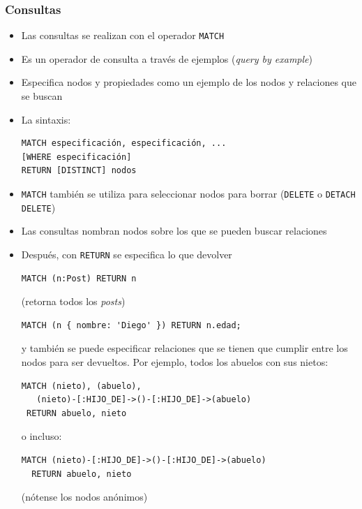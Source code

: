 \documentclass[14pt]{beamer}
\begin{document}
\begin{frame}
\begin{itemize}
\begin{frame}
  \frametitle{Consultas}
  \begin{itemize}
  \item Las consultas se realizan con el operador {\tt MATCH}
  \item Es un operador de consulta a través de ejemplos ({\em query by
      example})
\item Especifica nodos y propiedades como un ejemplo de los nodos y
  relaciones que se buscan
\item La sintaxis:

\begin{lstlisting}[language=cypher]
MATCH especificación, especificación, ...
[WHERE especificación]
RETURN [DISTINCT] nodos
\end{lstlisting}

\item {\tt MATCH} también se utiliza para seleccionar nodos para borrar
  ({\tt DELETE} o {\tt DETACH DELETE})

  \item Las consultas nombran nodos sobre los que se pueden buscar
    relaciones
\item Después, con {\tt RETURN} se especifica lo que devolver
\begin{lstlisting}[language=cypher]
MATCH (n:Post) RETURN n
\end{lstlisting}
(retorna todos los {\em posts})

\begin{lstlisting}[language=cypher]
MATCH (n { nombre: 'Diego' }) RETURN n.edad;
\end{lstlisting}

y también se puede especificar relaciones que se tienen que cumplir entre
los nodos para ser devueltos. Por ejemplo, todos los abuelos con sus
nietos:

\begin{lstlisting}[language=cypher]
MATCH (nieto), (abuelo),
   (nieto)-[:HIJO_DE]->()-[:HIJO_DE]->(abuelo)
 RETURN abuelo, nieto
\end{lstlisting}
o incluso:
\begin{lstlisting}[language=cypher]
MATCH (nieto)-[:HIJO_DE]->()-[:HIJO_DE]->(abuelo)
  RETURN abuelo, nieto
\end{lstlisting}

(nótense los nodos anónimos)
  \end{itemize}
\end{frame}


\end{itemize}
\end{frame}
\end{document}

